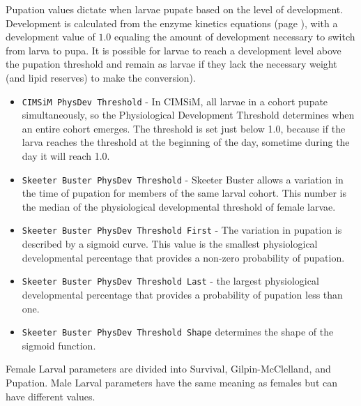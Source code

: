 \documentclass[11pt]{article}
\newcommand{\linecmd}[1]{\texttt{#1}}
\begin{document}
Pupation values dictate when larvae pupate based on the level of development. Development is calculated from the enzyme kinetics equations (page \pageref{kinetics}), with a development value of $1.0$ equaling the amount of development necessary to switch from larva to pupa. It is possible for larvae to reach a development level above the pupation threshold and remain as larvae if they lack the necessary weight (and lipid reserves) to make the conversion).
\begin{itemize}
	\item \linecmd{CIMSiM PhysDev Threshold} - In CIMSiM, all larvae in a cohort pupate simultaneously, so the Physiological Development Threshold determines when an entire cohort emerges. The threshold is set just below 1.0, because if the larva reaches the threshold at the beginning of the day, sometime during the day it will reach 1.0. 
	\item \linecmd{Skeeter Buster PhysDev Threshold} - Skeeter Buster allows a variation in the time of pupation for members of the same larval cohort. This number is the median of the physiological developmental threshold of female larvae. 
	\item \linecmd{Skeeter Buster PhysDev Threshold First} - The variation in pupation is described by a sigmoid curve. This value is the smallest physiological developmental percentage that provides a non-zero probability of pupation.
	\item \linecmd{Skeeter Buster PhysDev Threshold Last} - the largest physiological developmental percentage that provides a probability of pupation less than one.
	\item \linecmd{Skeeter Buster PhysDev Threshold Shape} determines the shape of the sigmoid function.
\end{itemize}

Female Larval parameters are divided into Survival, Gilpin-McClelland, and Pupation. Male Larval parameters have the same meaning as females but can have different values.
 
\end{document}
